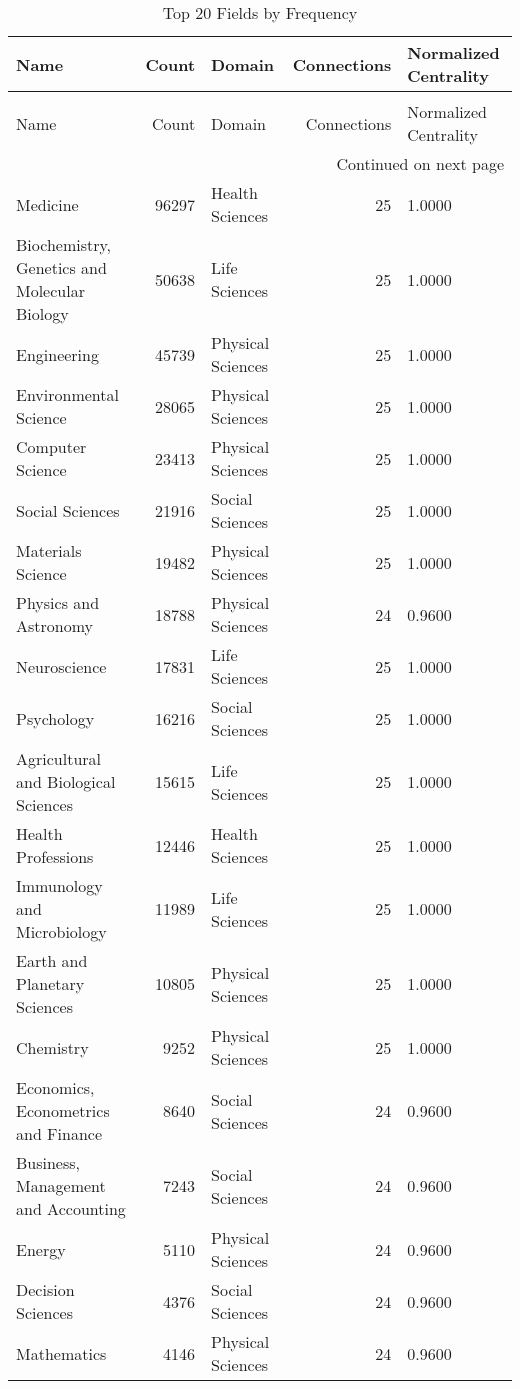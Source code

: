 \begin{longtable}{lrlrl}
\caption{Top 20 Fields by Frequency} \label{tab:top_20_fields} \\
\toprule
Name & Count & Domain & Connections & Normalized Centrality \\
\midrule
\endfirsthead
\caption[]{Top 20 Fields by Frequency} \\
\toprule
Name & Count & Domain & Connections & Normalized Centrality \\
\midrule
\endhead
\midrule
\multicolumn{5}{r}{Continued on next page} \\
\midrule
\endfoot
\bottomrule
\endlastfoot
Medicine & 96297 & Health Sciences & 25 & 1.0000 \\
Biochemistry, Genetics and Molecular Biology & 50638 & Life Sciences & 25 & 1.0000 \\
Engineering & 45739 & Physical Sciences & 25 & 1.0000 \\
Environmental Science & 28065 & Physical Sciences & 25 & 1.0000 \\
Computer Science & 23413 & Physical Sciences & 25 & 1.0000 \\
Social Sciences & 21916 & Social Sciences & 25 & 1.0000 \\
Materials Science & 19482 & Physical Sciences & 25 & 1.0000 \\
Physics and Astronomy & 18788 & Physical Sciences & 24 & 0.9600 \\
Neuroscience & 17831 & Life Sciences & 25 & 1.0000 \\
Psychology & 16216 & Social Sciences & 25 & 1.0000 \\
Agricultural and Biological Sciences & 15615 & Life Sciences & 25 & 1.0000 \\
Health Professions & 12446 & Health Sciences & 25 & 1.0000 \\
Immunology and Microbiology & 11989 & Life Sciences & 25 & 1.0000 \\
Earth and Planetary Sciences & 10805 & Physical Sciences & 25 & 1.0000 \\
Chemistry & 9252 & Physical Sciences & 25 & 1.0000 \\
Economics, Econometrics and Finance & 8640 & Social Sciences & 24 & 0.9600 \\
Business, Management and Accounting & 7243 & Social Sciences & 24 & 0.9600 \\
Energy & 5110 & Physical Sciences & 24 & 0.9600 \\
Decision Sciences & 4376 & Social Sciences & 24 & 0.9600 \\
Mathematics & 4146 & Physical Sciences & 24 & 0.9600 \\
\end{longtable}
